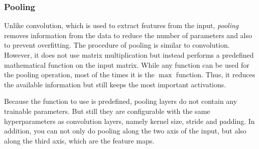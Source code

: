 \subsubsection{Pooling}
\label{sec:pooling}
Unlike convolution, which is used to extract features from the input, \emph{pooling} removes information from the data to reduce the number of parameters and also to prevent overfitting. The procedure of pooling is similar to convolution. However, it does not use matrix multiplication but instead performs a predefined mathematical function on the input matrix. While any function can be used for the pooling operation, most of the times it is the $\max$ function. Thus, it reduces the available information but still keeps the most important activations.~\cite[p.~369 f]{praxiseinstieg_ml17}

Because the function to use is predefined, pooling layers do not contain any trainable parameters. But still they are configurable with the same hyperparameters as convolution layers, namely kernel size, stride and padding. In addition, you can not only do pooling along the two axis of the input, but also along the third axis, which are the feature maps.~\cite[p.~370]{praxiseinstieg_ml17}

